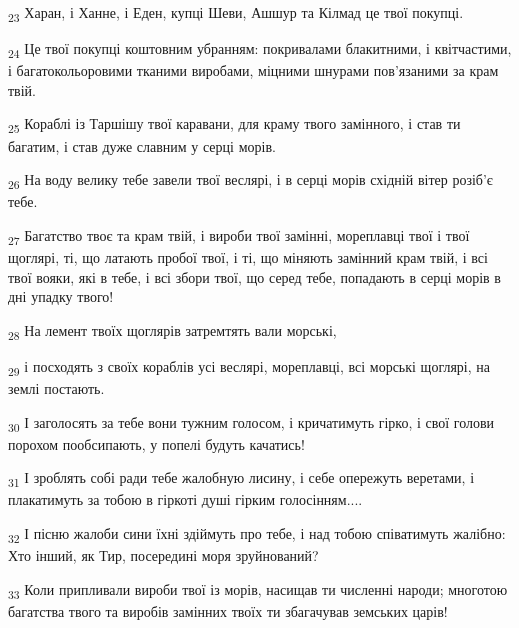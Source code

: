 \begin{tcolorbox}
\textsubscript{23} Харан, і Ханне, і Еден, купці Шеви, Ашшур та Кілмад це твої покупці.
\end{tcolorbox}
\begin{tcolorbox}
\textsubscript{24} Це твої покупці коштовним убранням: покривалами блакитними, і квітчастими, і багатокольоровими тканими виробами, міцними шнурами пов'язаними за крам твій.
\end{tcolorbox}
\begin{tcolorbox}
\textsubscript{25} Кораблі із Таршішу твої каравани, для краму твого замінного, і став ти багатим, і став дуже славним у серці морів.
\end{tcolorbox}
\begin{tcolorbox}
\textsubscript{26} На воду велику тебе завели твої веслярі, і в серці морів східній вітер розіб'є тебе.
\end{tcolorbox}
\begin{tcolorbox}
\textsubscript{27} Багатство твоє та крам твій, і вироби твої замінні, мореплавці твої і твої щоглярі, ті, що латають пробої твої, і ті, що міняють замінний крам твій, і всі твої вояки, які в тебе, і всі збори твої, що серед тебе, попадають в серці морів в дні упадку твого!
\end{tcolorbox}
\begin{tcolorbox}
\textsubscript{28} На лемент твоїх щоглярів затремтять вали морські,
\end{tcolorbox}
\begin{tcolorbox}
\textsubscript{29} і посходять з своїх кораблів усі веслярі, мореплавці, всі морські щоглярі, на землі постають.
\end{tcolorbox}
\begin{tcolorbox}
\textsubscript{30} І заголосять за тебе вони тужним голосом, і кричатимуть гірко, і свої голови порохом пообсипають, у попелі будуть качатись!
\end{tcolorbox}
\begin{tcolorbox}
\textsubscript{31} І зроблять собі ради тебе жалобную лисину, і себе опережуть веретами, і плакатимуть за тобою в гіркоті душі гірким голосінням....
\end{tcolorbox}
\begin{tcolorbox}
\textsubscript{32} І пісню жалоби сини їхні здіймуть про тебе, і над тобою співатимуть жалібно: Хто інший, як Тир, посередині моря зруйнований?
\end{tcolorbox}
\begin{tcolorbox}
\textsubscript{33} Коли припливали вироби твої із морів, насищав ти численні народи; многотою багатства твого та виробів замінних твоїх ти збагачував земських царів!
\end{tcolorbox}

